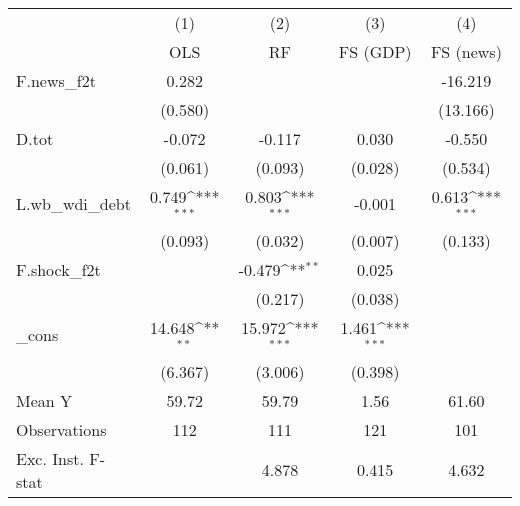 {
\def\sym#1{\ifmmode^{#1}\else\(^{#1}\)\fi}
\begin{tabular}{l*{4}{c}}
\toprule
            &\multicolumn{1}{c}{(1)}&\multicolumn{1}{c}{(2)}&\multicolumn{1}{c}{(3)}&\multicolumn{1}{c}{(4)}\\
            &\multicolumn{1}{c}{OLS}&\multicolumn{1}{c}{RF}&\multicolumn{1}{c}{FS (GDP)}&\multicolumn{1}{c}{FS (news)}\\
\midrule
F.news\_f2t  &       0.282         &                     &                     &     -16.219         \\
            &     (0.580)         &                     &                     &    (13.166)         \\
\addlinespace
D.tot       &      -0.072         &      -0.117         &       0.030         &      -0.550         \\
            &     (0.061)         &     (0.093)         &     (0.028)         &     (0.534)         \\
\addlinespace
L.wb\_wdi\_debt&       0.749\sym{***}&       0.803\sym{***}&      -0.001         &       0.613\sym{***}\\
            &     (0.093)         &     (0.032)         &     (0.007)         &     (0.133)         \\
\addlinespace
F.shock\_f2t &                     &      -0.479\sym{**} &       0.025         &                     \\
            &                     &     (0.217)         &     (0.038)         &                     \\
\addlinespace
\_cons      &      14.648\sym{**} &      15.972\sym{***}&       1.461\sym{***}&                     \\
            &     (6.367)         &     (3.006)         &     (0.398)         &                     \\
\midrule
Mean Y      &       59.72         &       59.79         &        1.56         &       61.60         \\
Observations&         112         &         111         &         121         &         101         \\
Exc. Inst. F-stat&                     &       4.878         &       0.415         &       4.632         \\
\bottomrule
\end{tabular}
}
